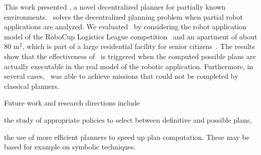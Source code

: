 This work presented  \toolName, a novel decentralized planner for partially known environments.
\toolName\ solves the decentralized planning problem when partial robot applications are analyzed.
We evaluated \toolName\ by considering the robot application model of the RoboCup Logistics League competition~\cite{karrasrobocup} and an apartment of about 80 m$^2$, which is part of a large residential facility for senior citizens~\cite{map}.
The results show that the effectiveness of \toolName\ is triggered when the computed possible plans are actually executable in the real model of the robotic application.
Furthermore, in several cases, \toolName\ was able to achieve missions that could not be completed by classical planners.

Future work and research directions include
\begin{enumerate*}
\item the study of appropriate policies to select between definitive and possible plans, %
\item the use of more efficient planners to speed up plan computation.
These may be based for example on symbolic techniques.
\end{enumerate*}
